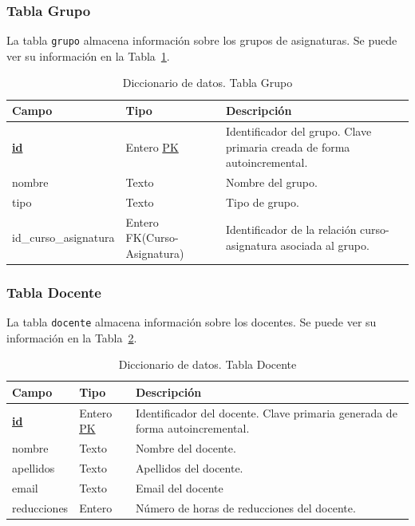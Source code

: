 \subsubsection{Tabla Grupo}
La tabla \texttt{grupo} almacena información sobre los grupos de asignaturas. 
Se puede ver su información en la Tabla~\ref{tab:diccionario_grupo}.

\begin{table}
  \centering 
  \begin{tabular}{l p{} p{}}
    \toprule
    \textbf{Campo} & \textbf{Tipo} & \textbf{Descripción}\\
    \midrule
    \textbf{\underline{id}} & Entero \underline{PK} & Identificador del grupo. Clave primaria creada de forma autoincremental. \\ \addlinespace
    nombre & Texto & Nombre del grupo. \\ \addlinespace
    tipo & Texto & Tipo de grupo. \\ \addlinespace
    id\_curso\_asignatura & Entero FK(Curso-Asignatura) & Identificador de la relación curso-asignatura asociada al grupo. \\
    \bottomrule
  \end{tabular}
  \caption{Diccionario de datos. Tabla Grupo}
  \label{tab:diccionario_grupo}
\end{table}

\subsubsection{Tabla Docente}
La tabla \texttt{docente} almacena información sobre los docentes. Se puede ver su información en la Tabla~\ref{tab:diccionario_docente}.

\begin{table}
  \centering 
  \begin{tabular}{l p{} p{}}
    \toprule
    \textbf{Campo} & \textbf{Tipo} & \textbf{Descripción}\\
    \midrule
    \textbf{\underline{id}} & Entero \underline{PK} & Identificador del docente. Clave primaria generada de forma autoincremental. \\ \addlinespace
    nombre & Texto & Nombre del docente. \\ \addlinespace
    apellidos & Texto & Apellidos del docente. \\ \addlinespace
    email & Texto & Email del docente \\ \addlinespace
    reducciones & Entero & Número de horas de reducciones del docente. \\
    \bottomrule
  \end{tabular}
  \caption{Diccionario de datos. Tabla Docente}
  \label{tab:diccionario_docente}
\end{table}


